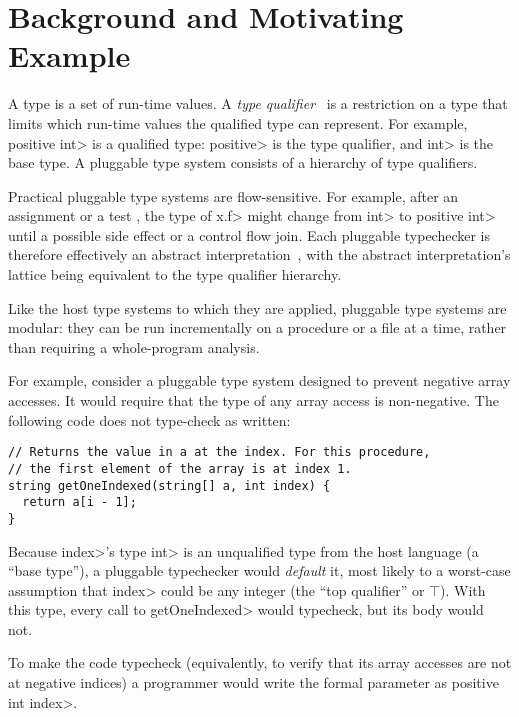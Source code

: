 \section{Background and Motivating Example}
\label{sec:motivating-example}

A type is a set of run-time values.
A \textit{type qualifier}~\cite{FosterFFA99}
is a restriction on a type that limits which run-time values
the qualified type can represent. For example, \<positive int>
is a qualified type: \<positive> is the type qualifier, and \<int>
is the base type.
%
A pluggable type system consists of a hierarchy of type qualifiers.

Practical pluggable type systems are flow-sensitive.
For example, after an assignment  or a test
, the type of \<x.f>
might change from \<int> to \<positive int>
until a possible side effect or a control flow join.
%
Each pluggable typechecker is therefore effectively
an abstract interpretation~\cite{Cousot1997}, with the
abstract interpretation's lattice being equivalent to
the type qualifier hierarchy.

Like the host type systems to which they are applied,
pluggable type systems are modular:  they can be run incrementally on a
procedure or a file at a time, rather than requiring a whole-program
analysis.

For example, consider a pluggable type system
designed to prevent negative array accesses.
It would require that the type of any array access is non-negative.
The following code does not type-check as written:

\begin{Verbatim}
// Returns the value in a at the index. For this procedure,
// the first element of the array is at index 1.
string getOneIndexed(string[] a, int index) {
  return a[i - 1];
}
\end{Verbatim}

Because \<index>'s type \<int> is an unqualified type from the host language
(\ie a ``base type''),
a pluggable typechecker would \emph{default}
it, most likely to a worst-case assumption that \<index> could
be any integer (the ``top qualifier'' or $\top$).
%
With this type, every call to \<getOneIndexed> would typecheck, but its
body would not.


To make the code typecheck (equivalently, to verify that its array accesses
are not at negative indices)
a programmer would write the formal parameter as
\<positive int index>.

